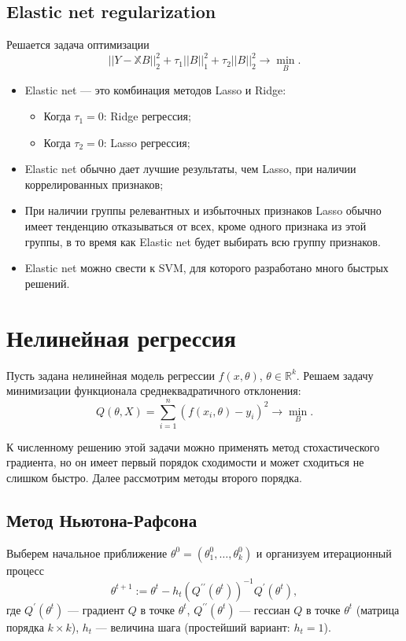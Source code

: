 \documentclass[11pt,colorlinks=true]{article}
\begin{document}
\subsection{Elastic net regularization}
Решается задача оптимизации
\begin{equation*}
||Y-\mathbb{X}B||_{2}^{2} + \tau_{1}||B||_{1}^{2}+\tau_{2}||B||_{2}^{2}
\rightarrow\min_{B}.
\end{equation*}
\begin{itemize}
\item Elastic net --- это комбинация методов Lasso и Ridge:
\begin{itemize}
\item Когда $\tau_1 = 0$: Ridge регрессия;
\item Когда $\tau_2 = 0$: Lasso регрессия;
\end{itemize}
\item Elastic net обычно дает лучшие результаты, чем Lasso, при наличии коррелированных признаков;
\item При наличии группы релевантных и избыточных признаков Lasso обычно имеет тенденцию отказываться от всех, кроме одного признака из этой группы, в то время как Elastic net будет выбирать всю группу признаков.
\item Elastic net можно свести к SVM, для которого разработано много быстрых решений.
\end{itemize}

\section{Нелинейная регрессия}

 Пусть задана нелинейная модель регрессии $f(x,\theta)$, $\theta\in\mathbb{R}^{k}$.
 Решаем задачу минимизации функционала среднеквадратичного отклонения:
\begin{equation*}
Q(\theta,X)
=
\sum_{i=1}^{n}\left(
f(x_{i},\theta)-y_{i}
\right)^{2}
\to
\min_{B}.
\end{equation*}

К численному решению этой задачи можно применять метод стохастического градиента,  но он имеет первый порядок сходимости и может сходиться не слишком быстро. Далее рассмотрим методы второго порядка.

\subsection{Метод Ньютона-Рафсона}

Выберем начальное приближение $\theta^{0}=(\theta_{1}^{0},\ldots,\theta_{k}^{0})$ и организуем итерационный процесс
\begin{equation}\label{eq:iteration}
\theta^{t+1}:=
\theta^{t}
-
h_{t}(Q^{\prime\prime}(\theta^{t}))^{-1}Q^{\prime}(\theta^{t}),
\end{equation}
где $Q^{\prime}(\theta^{t})$ --- градиент $Q$ в точке $\theta^{t}$, $Q^{\prime\prime}(\theta^{t})$ --- гессиан $Q$ в точке $\theta^{t}$ (матрица порядка $k\times k$), $h_{t}$ --- величина шага (простейший вариант: $h_{t}=1$).
\end{document}

